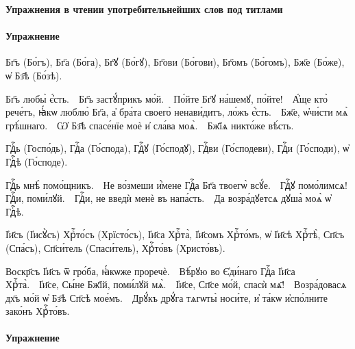 \documentclass[11pt,a4paper,oneside]{memoir}
\begin{document}
    \textbf{Упражнения в чтении употребительнейших слов под титлами}

                    \paragraph{Упражнение}
    
    \begin{slv}
        Бг҃ъ (Бо́гъ), Бг҃а (Бо́га), Бг҃ꙋ (Бо́гꙋ), Бг҃ови (Бо́гови), Бг҃омъ (Бо́гомъ), Бж҃е (Бо́же), ѡ҆ Бз҃ѣ (Бо́зѣ).
        
        Бг҃ъ любы̀ є҆́сть.~\textemdash~Бг҃ъ застꙋ́прикъ мо́й.~\textemdash~По́йте Бг҃ꙋ на́шемꙋ, по́йте!~\textemdash~А҆́ще кто̀ рече́тъ, ꙗ҆́кѡ люблю̀ Бг҃а, а҆ бра́та своего̀ ненави́дитъ, ло́жъ є҆́сть.~\textemdash~Бж҃е, ѡ҆чи́сти мѧ̀ грѣ́шнаго.~\textemdash~Ѡ҆ Бз҃ѣ спасе́нїе моѐ и҆ сла́ва моѧ̀.~\textemdash~Бж҃їѧ никто́же вѣ́сть.
        
        Гдⷭ҇ь (Госпо́дь), Гдⷭ҇а (Го́спода), Гдⷭ҇ꙋ (Го́сподꙋ), Гдⷭ҇ви (Го́сподеви), Гдⷭ҇и (Го́споди), ѡ҆ Гдⷭ҇ѣ (Го́споде).
        
        Гдⷭ҇ь мнѣ̀ помо́щникъ.~\textemdash~Не во́змеши и҆́мене Гдⷭ҇а Бг҃а твоегѡ̀ всꙋ́е.~\textemdash~Гдⷭ҇ꙋ помо́лимсѧ! Гдⷭ҇и, поми́лꙋй.~\textemdash~Гдⷭ҇и, не введѝ менѐ въ напа́сть.~\textemdash~Да возра́дꙋетсѧ дꙋша̀ моѧ̀ ѡ҆ Гдⷭ҇ѣ.
        
        І҆и҃съ (І҆исꙋ̀съ) Хрⷭ҇то́съ (Хрїсто́съ), І҆и҃са Хрⷭ҇та̀, І҆и҃сомъ Хрⷭ҇то́мъ, ѡ҆ І҆и҃сѣ Хрⷭ҇тѣ̀, Сп҃съ (Спа́съ), Сп҃си́тель (Спаси́тель), Хрⷭ҇то́въ (Христо́въ).
        
        Воскр҃съ І҆и҃съ ѿ гро́ба, ꙗ҆́кѡже проречѐ.~\textemdash~Вѣ́рꙋю во Є҆ди́наго Гдⷭ҇а І҆и҃са Хрⷭ҇та̀.~\textemdash~І҆и҃се, Сы́не Бж҃їй, поми́лꙋй мѧ̀.~\textemdash~І҆и҃се, Сп҃се мо́й, спасѝ мѧ҃!~\textemdash~Возра́довасѧ дх҃ъ мо́й ѡ҆ Бз҃ѣ Сп҃сѣ мое́мъ.~\textemdash~Дрꙋ́къ дрꙋ́га тѧгѡты̀ носи́те, и҆ та́кѡ и҆спо́лните зако́нъ Хрⷭ҇то́въ.
    \end{slv}

                    \paragraph{Упражнение}
    
\end{document}
